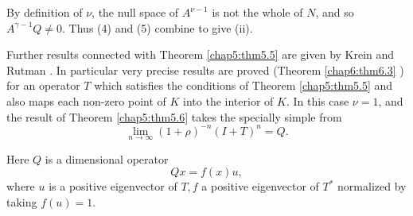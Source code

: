 By definition of $\nu$, the null space of $A^{\nu-1}$ is not the whole
of $N$, and so $A^{\gamma-1} Q \neq 0$. Thus (4) and (5) combine to
give (ii). 

Further results connected with Theorem \ref{chap5:thm5.5} are given by
Krein and Rutman \cite{key20}. In particular very precise results are
proved (Theorem \ref{chap6:thm6.3} \cite{key20}) for an operator $T$
which satisfies 
the conditions of Theorem \ref{chap5:thm5.5} and also maps each
non-zero point of $K$ into the  interior of $K$. In this case $\nu=1$,
and the result of Theorem \ref{chap5:thm5.6} takes the specially simple from   
$$
\lim_{n \to \infty} (1+\rho)^{-n} (I+T)^n = Q.
$$

Here $Q$ is a dimensional operator
$$
Qx = f (x) u ,
$$
where $u$ is a positive eigenvector of $T, f$ a positive eigenvector
of $T^*$ normalized by taking $f(u) = 1$. 
